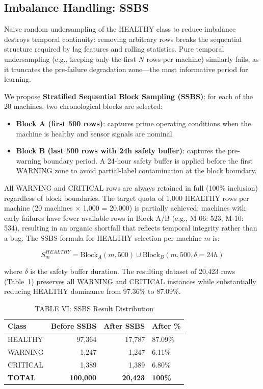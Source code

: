 \documentclass[conference]{IEEEtran}
\begin{document}
\subsection{Imbalance Handling: SSBS}

Naive random undersampling of the HEALTHY class to reduce imbalance destroys temporal continuity: removing arbitrary rows breaks the sequential structure required by lag features and rolling statistics. Pure temporal undersampling (e.g., keeping only the first $N$ rows per machine) similarly fails, as it truncates the pre-failure degradation zone—the most informative period for learning.

We propose \textbf{Stratified Sequential Block Sampling (SSBS)}: for each of the 20 machines, two chronological blocks are selected:
\begin{itemize}
\item \textbf{Block A (first 500 rows)}: captures prime operating conditions when the machine is healthy and sensor signals are nominal.
\item \textbf{Block B (last 500 rows with 24h safety buffer)}: captures the pre-warning boundary period. A 24-hour safety buffer is applied before the first WARNING zone to avoid partial-label contamination at the block boundary.
\end{itemize}

All WARNING and CRITICAL rows are always retained in full (100\% inclusion) regardless of block boundaries. The target quota of 1,000 HEALTHY rows per machine (20 machines $\times$ 1,000 = 20,000) is partially achieved; machines with early failures have fewer available rows in Block A/B (e.g., M-06: 523, M-10: 534), resulting in an organic shortfall that reflects temporal integrity rather than a bug. The SSBS formula for HEALTHY selection per machine $m$ is:

\begin{equation}
S_m^{HEALTHY} = \text{Block}_A(m, 500) \cup \text{Block}_B(m, 500, \delta=24h)
\label{eq:ssbs}
\end{equation}

where $\delta$ is the safety buffer duration. The resulting dataset of 20,423 rows (Table~\ref{tab:ssbs}) preserves all WARNING and CRITICAL instances while substantially reducing HEALTHY dominance from 97.36\% to 87.09\%.

\begin{table}[htbp]
\caption{TABLE VI: SSBS Result Distribution}
\centering
\begin{tabular}{lrrl}
\hline
\textbf{Class} & \textbf{Before SSBS} & \textbf{After SSBS} & \textbf{After \%} \\
\hline
HEALTHY & 97,364 & 17,787 & 87.09\% \\
WARNING & 1,247 & 1,247 & 6.11\% \\
CRITICAL & 1,389 & 1,389 & 6.80\% \\
\hline
\textbf{TOTAL} & \textbf{100,000} & \textbf{20,423} & \textbf{100\%} \\
\hline
\end{tabular}
\label{tab:ssbs}
\end{table}
\end{document}
